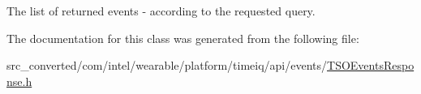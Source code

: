 The list of returned events -\/ according to the requested query. 



The documentation for this class was generated from the following file\+:\begin{DoxyCompactItemize}
\item 
src\+\_\+converted/com/intel/wearable/platform/timeiq/api/events/\hyperlink{_t_s_o_events_response_8h}{T\+S\+O\+Events\+Response.\+h}\end{DoxyCompactItemize}

